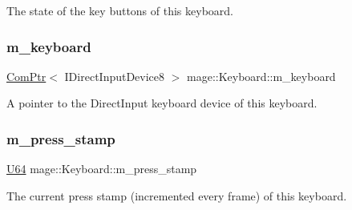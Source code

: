 The state of the key buttons of this keyboard. \hypertarget{classmage_1_1_keyboard_a992b8b8caf0d858163e5e9af04302324}{}\label{classmage_1_1_keyboard_a992b8b8caf0d858163e5e9af04302324} 
\subsubsection{\texorpdfstring{m\+\_\+keyboard}{m\_keyboard}}
{\footnotesize\ttfamily \hyperlink{namespacemage_ae74f374780900893caa5555d1031fd79}{Com\+Ptr}$<$ I\+Direct\+Input\+Device8 $>$ mage\+::\+Keyboard\+::m\+\_\+keyboard\hspace{0.3cm}{\ttfamily [private]}}

A pointer to the Direct\+Input keyboard device of this keyboard. \hypertarget{classmage_1_1_keyboard_a075349dbce5145f46146ccdfea78214a}{}\label{classmage_1_1_keyboard_a075349dbce5145f46146ccdfea78214a} 
\subsubsection{\texorpdfstring{m\+\_\+press\+\_\+stamp}{m\_press\_stamp}}
{\footnotesize\ttfamily \hyperlink{namespacemage_a6672cf3c861707ce4a3235a3eb43941d}{U64} mage\+::\+Keyboard\+::m\+\_\+press\+\_\+stamp\hspace{0.3cm}{\ttfamily [private]}}

The current press stamp (incremented every frame) of this keyboard. 
